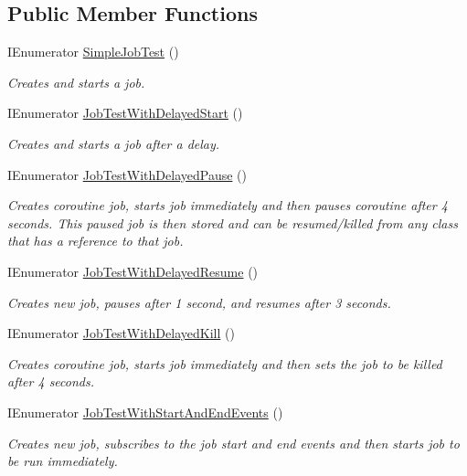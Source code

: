 \subsection*{Public Member Functions}
\begin{DoxyCompactItemize}
\item 
I\+Enumerator \hyperlink{class_example_job_test_ab235738389e731b6e1c1a0936bfb6585}{Simple\+Job\+Test} ()
\begin{DoxyCompactList}\small\item\em Creates and starts a job. \end{DoxyCompactList}\item 
I\+Enumerator \hyperlink{class_example_job_test_a1bf38c8133ef7854e4b3ef89103888df}{Job\+Test\+With\+Delayed\+Start} ()
\begin{DoxyCompactList}\small\item\em Creates and starts a job after a delay. \end{DoxyCompactList}\item 
I\+Enumerator \hyperlink{class_example_job_test_ac390bb8191f6ba7b6df2deb646c7c7de}{Job\+Test\+With\+Delayed\+Pause} ()
\begin{DoxyCompactList}\small\item\em Creates coroutine job, starts job immediately and then pauses coroutine after 4 seconds. This paused job is then stored and can be resumed/killed from any class that has a reference to that job. \end{DoxyCompactList}\item 
I\+Enumerator \hyperlink{class_example_job_test_af80fb4b62309ca6833878c49b82df703}{Job\+Test\+With\+Delayed\+Resume} ()
\begin{DoxyCompactList}\small\item\em Creates new job, pauses after 1 second, and resumes after 3 seconds. \end{DoxyCompactList}\item 
I\+Enumerator \hyperlink{class_example_job_test_a95678534abfb975339db76044a92b28d}{Job\+Test\+With\+Delayed\+Kill} ()
\begin{DoxyCompactList}\small\item\em Creates coroutine job, starts job immediately and then sets the job to be killed after 4 seconds. \end{DoxyCompactList}\item 
I\+Enumerator \hyperlink{class_example_job_test_a5c211a493fa17b33b35ba64214d1bb09}{Job\+Test\+With\+Start\+And\+End\+Events} ()
\begin{DoxyCompactList}\small\item\em Creates new job, subscribes to the job start and end events and then starts job to be run immediately. \end{DoxyCompactList}\item 

\end{DoxyCompactItemize}
